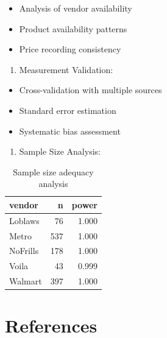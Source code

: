 \documentclass[
  letterpaper,
  DIV=11,
  numbers=noendperiod]{scrartcl}
\providecommand{\tightlist}{%
  \setlength{\itemsep}{0pt}\setlength{\parskip}{0pt}}\usepackage{longtable,booktabs,array}
\begin{document}
\begin{itemize}
\item
  Analysis of vendor availability
\item
  Product availability patterns
\item
  Price recording consistency
\end{itemize}

\begin{enumerate}
\def\labelenumi{\arabic{enumi}.}
\setcounter{enumi}{1}
\tightlist
\item
  Measurement Validation:
\end{enumerate}

\begin{itemize}
\item
  Cross-validation with multiple sources
\item
  Standard error estimation
\item
  Systematic bias assessment
\end{itemize}

\begin{enumerate}
\def\labelenumi{\arabic{enumi}.}
\setcounter{enumi}{2}
\tightlist
\item
  Sample Size Analysis:
\end{enumerate}

\begin{longtable}[t]{lrr}

\caption{\label{tbl-sample-size}Sample size adequacy analysis}

\tabularnewline

\toprule
vendor & n & power\\
\midrule
Loblaws & 76 & 1.000\\
Metro & 537 & 1.000\\
NoFrills & 178 & 1.000\\
Voila & 43 & 0.999\\
Walmart & 397 & 1.000\\
\bottomrule

\end{longtable}

\newpage

\section*{References}\label{references}
\end{document}
